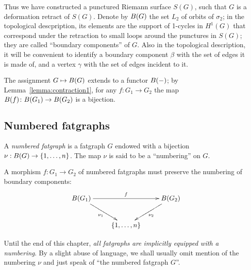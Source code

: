 Thus we have constructed a punctured Riemann surface $S(G)$, such that
$G$ is a deformation retract of $S(G)$.  Denote by $B(G)$ the set
$L_2$ of orbits of $\sigma_2$; in the topological descpription, its
elements are the support of 1-cycles in $H^1(G)$ that correspond under
the retraction to small loops around the punctures in $S(G)$; they are
called ``boundary components'' of $G$.  Also in the topological
description, it will be convenient to identify a boundary component
$\beta$ with the set of edges it is made of, and a vertex $\gamma$ with the set
of edges incident to it.  

The assignment $G \mapsto B(G)$ extends to a functor $B(-)$;
by Lemma~\ref{lemma:contraction1}, for any $f\colon G_1 \to G_2$ the
map $B(f) \colon B(G_1) \to B(G_2)$ is a bijection.

\subsection{Numbered fatgraphs}
\label{sec:numbered-rg}

\begin{definition}
  A \emph{numbered fatgraph} is a fatgraph $G$ endowed with a
  bijection $\nu: B(G) \to \{1,\ldots, n\}$.  The map $\nu$ is
  said to be a ``numbering'' on $G$.

  A morphism $f: G_1 \to G_2$ of numbered fatgraphs must preserve the
  numbering of boundary components:
  \begin{equation*}
    \xymatrix{%
      \Holes{G_1} &  & \Holes{G_2}
      \\
      & \{ 1, \ldots, n \} &
      \ar^{f} "1,1";"1,3"
      \ar_{\nu_1} "1,1";"2,2"
      \ar^{\nu_2} "1,3";"2,2"
    }%
  \end{equation*}
\end{definition}

Until the end of this chapter, \emph{all fatgraphs are implicitly
  equipped with a numbering}. By a slight abuse of language, we shall
usually omit mention of the numbering $\nu$ and just speak of ``the
numbered fatgraph $G$''.

